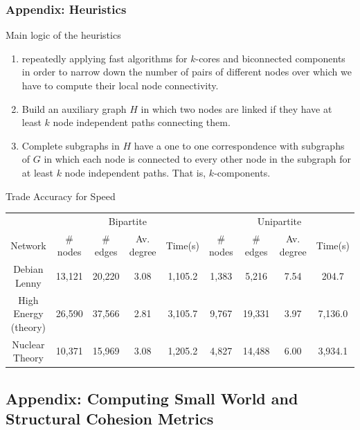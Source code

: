 \documentclass[ignorenonframetext,red,8pt,notes=hide]{beamer}
\begin{document}
\begin{frame}
\frametitle{Appendix: Heuristics}

\begin{block}{Main logic of the heuristics}

\begin{enumerate}

\item repeatedly applying fast algorithms for $k$-cores \citep{batagelj:2011} and biconnected components \citep{tarjan:1972} in order to narrow down the number of pairs of different nodes over which we have to compute their local node connectivity.

\item Build an auxiliary graph $H$ in which two nodes are linked if they have at least $k$ node independent paths connecting them.

\item Complete subgraphs in $H$ have a one to one correspondence with subgraphs of $G$ in which each node is connected to every other node in the subgraph for at least $k$ node independent paths. That is, $k$-components.

\end{enumerate}
\end{block}

\pause

\begin{block}{Trade Accuracy for Speed}
\begin{tiny}
\begin{tabular}{|c|c|c|c|c|c|c|c|c|}
\hline
&\multicolumn{4}{|c|}{Bipartite}&\multicolumn{4}{|c|}{Unipartite}\\
Network&\# nodes&\# edges&Av. degree&Time(s)&\# nodes&\# edges&Av. degree&Time(s)\\
\hline
Debian Lenny&13,121&20,220&3.08&1,105.2&1,383&5,216&7.54&204.7\\
High Energy (theory)&26,590&37,566&2.81&3,105.7&9,767&19,331&3.97&7,136.0\\
Nuclear Theory&10,371&15,969&3.08&1,205.2&4,827&14,488&6.00&3,934.1\\
\hline
\end{tabular}
\end{tiny}
\end{block}

\end{frame}

\subsection*{Appendix: Computing Small World and Structural Cohesion Metrics}
\end{document}
